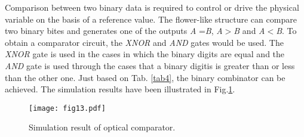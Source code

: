 \documentclass{osa-article}
\begin{document}
  \begin{table}[H]
\caption{Logical truth table of the proposed TDM and OPP levels at the input and output (N.A = do not care).}
\centering 
{}
\label{tab3} %
\end{table}

Comparison between two binary data is required to control or drive the physical variable on the basis of a reference value. The flower-like structure can compare two binary bites and generates one of the outputs \textit {A} =\textit {B}, \textit {A}$>$\textit {B} and \textit {A}$<$\textit {B}. To obtain a comparator circuit, the \textit{XNOR} and \textit{AND} gates would be used. The \textit{XNOR} gate is used in the cases in which the binary digits are equal and the \textit{AND} gate is used through the cases that a binary digitis is greater than or less than the other one. Just based on Tab. \ref{tab4}, the binary combinator can be achieved. The simulation results have been illustrated in Fig.\ref{fig13}.\\
\begin{figure}[tb]
\centering
\texttt{[image: fig13.pdf]}
	\caption{Simulation result of optical comparator.}
	\label{fig13}
\end{figure}
 
\end{document}
